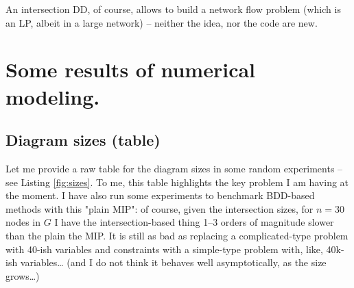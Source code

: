 \documentclass[11pt]{article}
\begin{document}
An intersection DD, of course, allows to build a network flow problem (which is
an LP, albeit in a large network) -- neither the idea, nor the code are new.

\section{Some results of numerical modeling.}
\label{sec:org3c267b8}

\subsection{Diagram sizes (table)}
\label{sec:org2ef2e7c}
Let me provide a raw table for the diagram sizes in some random experiments --
see Listing \ref{fig:sizes}. To me, this table highlights the key problem I am having
at the moment. I have also run some experiments to benchmark BDD-based methods
with this "plain MIP": of course, given the intersection sizes, for \(n=30\) nodes
in \(G\) I have the intersection-based thing 1--3 orders of magnitude slower than
the plain the MIP. It is still as bad as replacing a complicated-type problem
with 40-ish variables and constraints with a simple-type problem with, like,
40k-ish variables\ldots{} (and I do not think it behaves well asymptotically, as the size grows\ldots{})
\end{document}
